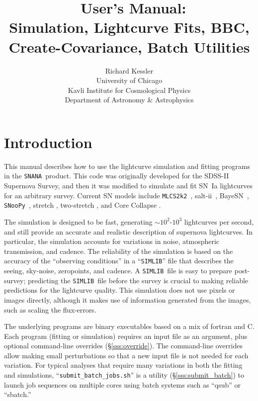 \documentclass[12pt]{article}
\title{ \snana\ User's Manual: \\ 
         Simulation, Lightcurve Fits, BBC, 
         Create-Covariance, Batch Utilities}
\author{Richard Kessler \\ University of Chicago \\ 
    Kavli Institute for Cosmological Physics \\
    Department of Astronomy \& Astrophysics }
\newcommand{\mlcs}{{\tt MLCS2k2}}
\newcommand{\SALTII}{{\sc salt-ii}}
\newcommand{\BAYESN}{{\sc BayeSN}}
\newcommand{\snoopy}{{\tt SNooPy}}
\newcommand{\snana}{{\tt SNANA}}
\newcommand{\simlib}{{\tt SIMLIB}}
\newcommand{\trans}{transmission}
\newcommand{\submit}{\tt submit\_batch\_jobs.sh}
\begin{document}
\maketitle
\tableofcontents
\clearpage


   \section{Introduction}
   \label{sec:intro}

This manual describes how to use the lightcurve simulation 
and fitting programs in the \snana\ product. This code was 
originally developed for the SDSS-II Supernova Survey, 
and then it was  modified to simulate and fit 
SN~Ia lightcurves for an arbitrary survey.
Current SN models include 
\mlcs\ \cite{JRK07}, 
\SALTII\ \cite{Guy07},
\BAYESN\ \cite{Mandel2022},
\snoopy\ \cite{Burns11},
stretch \cite{Gold01}, 
two-stretch \cite{Hayden09}, 
  and
Core Collapse \cite{K10_challenge}.


The simulation is designed to be fast, generating $\sim 10^2$-$10^3$
lightcurves per second, and still provide an accurate and
realistic description of supernova lightcurves.
In particular, the simulation accounts for variations in
noise, atmospheric \trans, and cadence.
The reliability of the simulation is based on the accuracy
of the ``observing conditions''  in a ``{\simlib}'' file that 
describes the seeing, sky-noise, zeropoints, and cadence.
A \simlib\ file is easy to prepare post-survey;
predicting the \simlib\ file before the survey is crucial
to making reliable predictions for the lightcurve quality.
This simulation does not use pixels or images directly,
although it makes use of information generated from the images,
such as scaling the flux-errors.


The underlying programs are binary executables based on
a mix of fortran and C. Each program (fitting or simulation)
requires an input file as an argument, plus optional command-line
overrides (\S\ref{sss:override}).
The command-line overrides allow making small perturbations
so that a new input file is not needed for each variation.
For typical analyses that require many variations in both
the fitting and simulations, 
``{\submit}'' is a utility (\S\ref{sss:submit_batch})
to launch job sequences on multiple cores using batch systems 
such as ``qsub'' or ``sbatch.'' 
\end{document}

